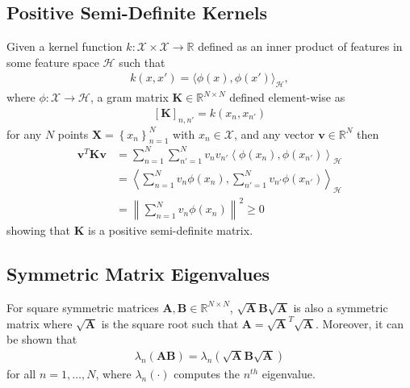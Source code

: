 \documentclass{article}
\numberwithin{equation}{section}
\begin{document}
\subsection{Positive Semi-Definite Kernels} \label{appendix:positive-definite-kernel}
Given a kernel function $k: \mathcal{X} \times \mathcal{X} \rightarrow \mathbb{R}$ defined as an inner product of features in some feature space $\mathcal{H}$ such that
\begin{align}
    k(x, x') = \langle \phi(x), \phi(x') \rangle_{\mathcal{H}},
\end{align}
where $\phi: \mathcal{X} \rightarrow \mathcal{H}$, a gram matrix $\mathbf{K} \in \mathbb{R}^{N\times N}$ defined element-wise as
\begin{align}
    \left[\mathbf{K}\right]_{n, n'} = k(x_n, x_{n'})
\end{align}
for any $N$ points $\mathbf{X} = \left\{x_n\right\}_{n=1}^N$ with $x_n \in \mathcal{X}$, and any vector $\mathbf{v} \in \mathbb{R}^N$ then
\begin{align}
    \mathbf{v}^T \mathbf{K} \mathbf{v} &= \sum_{n=1}^N\sum_{n'=1}^N v_n v_{n'}  \left\langle \phi(x_n), \phi(x_{n'}) \right\rangle_{\mathcal{H}} \\
    &= \left\langle\sum_{n=1}^N v_n \phi(x_n), \sum_{n'=1}^N  v_{n'}\phi(x_{n'}) \right\rangle_{\mathcal{H}} \\
    &= \left\| \sum_{n=1}^N v_n \phi(x_n) \right\|^2 \geq 0
\end{align}
showing that $\mathbf{K}$ is a positive semi-definite matrix.

\newpage
\subsection{Symmetric Matrix Eigenvalues}\label{appendix:eigenvalue-symmetric-matrix}
For square symmetric matrices $\mathbf{A}, \mathbf{B} \in \mathbb{R}^{N \times N}$, $\sqrt{\mathbf{A}}\mathbf{B}\sqrt{\mathbf{A}}$ is also a symmetric matrix where $\sqrt{\mathbf{A}}$ is the square root such that $\mathbf{A} = \sqrt{\mathbf{A}}^T \sqrt{\mathbf{A}}$. Moreover, it can be shown that
\begin{align}
    \lambda_{n} \left(\mathbf{A} \mathbf{B}\right) = \lambda_{n} \left(\sqrt{\mathbf{A}}\mathbf{B}\sqrt{\mathbf{A}}\right)
\end{align}
for all $n=1,\dots,N$, where $\lambda_{n}(\cdot)$ computes the $n^{th}$ eigenvalue.

\newpage
\end{document}
